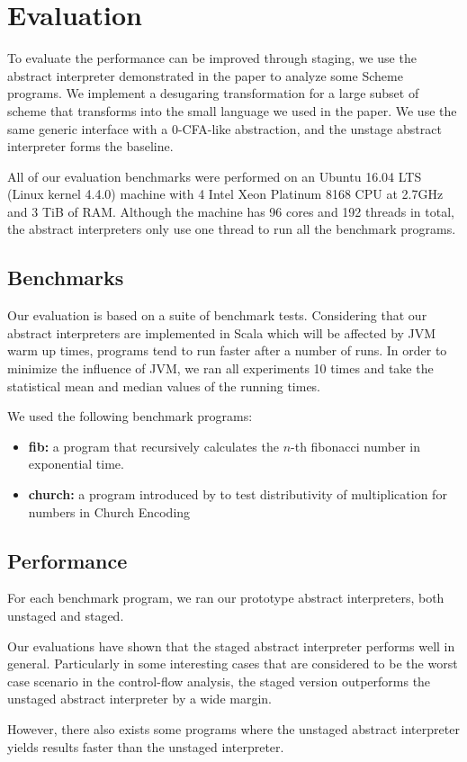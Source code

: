 \section{Evaluation} \label{evaluation}

To evaluate the performance can be improved through staging, we use the abstract
interpreter demonstrated in the paper to analyze some Scheme programs. We implement
a desugaring transformation for a large subset of scheme that transforms into the
small language we used in the paper.
We use the same generic interface with a 0-CFA-like abstraction, and the unstage abstract
interpreter forms the baseline.

All of our evaluation benchmarks were performed on an Ubuntu 16.04 LTS (Linux kernel 4.4.0)
machine with 4 Intel Xeon Platinum 8168 CPU at 2.7GHz and 3 TiB of RAM.
Although the machine has 96 cores and 192 threads in total,
the abstract interpreters only use one thread to run all the benchmark programs.

\subsection{Benchmarks}

Our evaluation is based on a suite of benchmark tests. Considering that our abstract 
interpreters are implemented in Scala which will be affected by JVM warm up times, programs
tend to run faster after a number of runs. In order to minimize the influence of JVM, 
we ran all experiments 10 times and take the statistical mean and median values of 
the running times.

We used the following benchmark programs:
\begin{itemize}
    \item \textbf{fib:} a program that recursively calculates the $n$-th fibonacci number in
        exponential time.
    \item \textbf{church:} a program introduced by  to test distributivity of multiplication for numbers in Church Encoding 
\end{itemize}

\subsection{Performance}

For each benchmark program, we ran our prototype abstract interpreters, both unstaged and staged.

Our evaluations have shown that the staged abstract interpreter performs well in general.
Particularly in some interesting cases that are considered to be the worst case scenario
in the control-flow analysis, the staged version outperforms the unstaged abstract 
interpreter by a wide margin. 

However, there also exists some programs where the unstaged abstract interpreter yields 
results faster than the unstaged interpreter.

